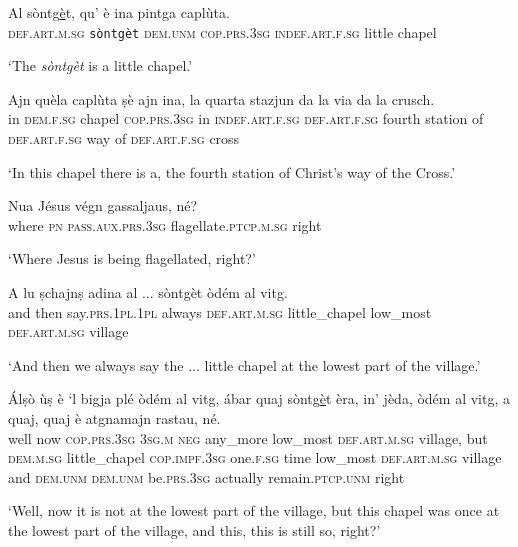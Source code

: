 \begin{linenumbers}
\gll Al sòntg\underline{è}t, qu’ è ina pintga caplùta.\\
 \textsc{def.art.m.sg} \texttt{sòntgèt} \textsc{dem.unm} \textsc{cop.prs.3sg} \textsc{indef.art.f.sg} little chapel\\
\end{linenumbers}
\medskip
\glt `The \textit{sòntgèt} is a little chapel.'
\medskip

\begin{linenumbers}
\gll Ajn quèla caplùta ṣè ajn ina, la quarta stazjun da la via da la crusch.\\
in \textsc{dem.f.sg} chapel \textsc{cop.prs.3sg} in \textsc{indef.art.f.sg} \textsc{def.art.f.sg} fourth station of \textsc{def.art.f.sg} way of \textsc{def.art.f.sg} cross \\
\end{linenumbers}
\medskip
\glt `In this chapel there is a, the fourth station of Christ’s way of the Cross.'
\medskip

\begin{linenumbers}
\gll  Nua\footnotemark{} Jésus végn gassaljaus, né?  \\
where \textsc{pn} \textsc{pass.aux.prs.3sg} flagellate.\textsc{ptcp.m.sg} right \\
\end{linenumbers}
\medskip
\glt `Where Jesus is being flagellated, right?'
\medskip

\begin{linenumbers}
\gll A lu ṣchajnṣ adina al ... sòntgèt òdém al vitg.\\
and then say.\textsc{prs.1pl.1pl} always \textsc{def.art.m.sg} {} little\_chapel low\_most \textsc{def.art.m.sg} village\\
\end{linenumbers}
\medskip
\glt `And then we always say the ... little chapel at the lowest part of the village.'
\medskip

\begin{linenumbers}
\gll  Álṣò ùṣ è `l bigja plé òdém al vitg, ábar quaj sòntg\underline{è}t èra, in’ jèda, òdém al vitg, a quaj, quaj è atgnamajn rastau, né. \\
well now  \textsc{cop.prs.3sg} \textsc{3sg.m} \textsc{neg} any\_more low\_most \textsc{def.art.m.sg} village, but \textsc{dem.m.sg} little\_chapel \textsc{cop.impf.3sg} one.\textsc{f.sg} time low\_most \textsc{def.art.m.sg} village and \textsc{dem.unm} \textsc{dem.unm} be.\textsc{prs.3sg} actually remain.\textsc{ptcp.unm} right\\
\end{linenumbers}
\medskip
\glt `Well, now it is not at the lowest part of the village, but this chapel was once at the lowest part of the village, and this, this is still so, right?'
\medskip

